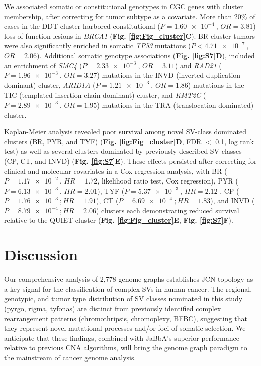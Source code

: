 \documentclass[phd,tocprelim]{cornell}
\begin{document}
We associated somatic or constitutional genotypes in CGC genes with cluster membership, after correcting for tumor subtype as a covariate. More than 20\% of cases in the DDT cluster harbored constitutional ($P = \SI{1.60e-4}{}$, $OR = 3.81$) loss of function lesions in \textit{BRCA1} (\textbf{Fig. \ref{fig:Fig_cluster}C}). BR-cluster tumors were also significantly enriched in somatic \textit{TP53} mutations ($P < \SI{4.71e-7}{}$, $OR = 2.06$). Additional somatic genotype associations (\textbf{Fig. \ref{fig:S7}D}), included an enrichment of \textit{SMC4} ($P = \SI{2.33e-3}{}$, $OR = 3.11$) and \textit{RAD21} ($P = \SI{1.96e-3}{}$, $OR = 3.27$) mutations in the INVD (inverted duplication dominant) cluster, \textit{ARID1A} ($P = \SI{1.21e-3}{}$, $OR = 1.86$) mutations in the TIC (templated insertion chain dominant) cluster, and \textit{KMT2C} ($P = \SI{2.89e-3}{}$, $OR = 1.95$) mutations in the TRA (translocation-dominated) cluster.

Kaplan-Meier analysis revealed poor survival among novel SV-class dominated clusters (BR, PYR, and TYF) (\textbf{Fig. \ref{fig:Fig_cluster}D}, FDR $<$ 0.1, log rank test) as well as several clusters dominated by previously-described SV classes (CP, CT, and INVD) (\textbf{Fig. \ref{fig:S7}E}).  These effects persisted after correcting for clinical and molecular covariates in a Cox regression analysis, with BR ($P = \SI{1.17e-2}{}$, $HR = 1.72$, likelihood ratio test, Cox regression), PYR ($P = \SI{6.13e-3}{}$, $HR = 2.01$), TYF ($P = \SI{5.37e-3}{}$, $HR = 2.12$ , CP ($P = \SI{1.76e-3}{}; HR = 1.91$), CT ($P = \SI{6.69e-4}{}; HR = 1.83$), and INVD ($P = \SI{8.79e-4}{}; HR = 2.06$) clusters each demonstrating reduced survival relative to the QUIET cluster (\textbf{Fig. \ref{fig:Fig_cluster}E}, \textbf{Fig. \ref{fig:S7}F}).

\section{Discussion}
Our comprehensive analysis of 2,778 genome graphs establishes JCN topology as a key signal for the classification of complex SVs in human cancer. The regional, genotypic, and tumor type distribution of SV classes nominated in this study (pyrgo, rigma, tyfonas) are distinct from previously identified complex rearrangement patterns (chromothripsis, chromoplexy, BFBC), suggesting that they represent novel mutational processes and/or foci of somatic selection.  We anticipate that these findings, combined with JaBbA's superior performance relative to previous CNA algorithms, will bring the genome graph paradigm to the mainstream of cancer genome analysis.
\end{document}
